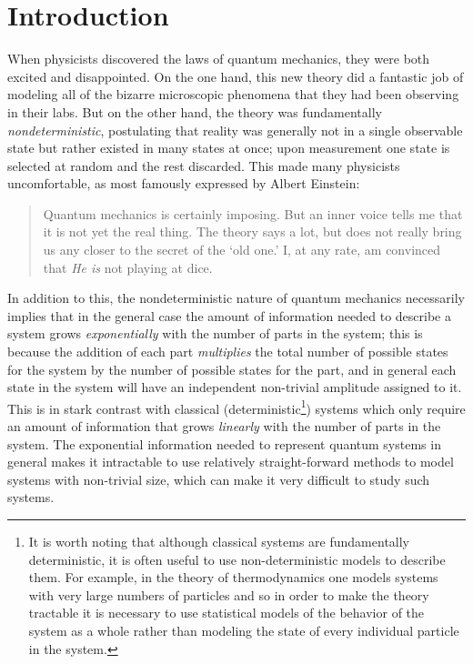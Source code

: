 \documentclass[12pt]{amsbook}
\theoremstyle{plain}
\theoremstyle{definition}
\theoremstyle{remark}
\begin{document}
\part{Introduction}

When physicists discovered the laws of quantum mechanics, they were both excited and disappointed.  On the one hand, this new theory did a fantastic job of modeling all of the bizarre microscopic phenomena that they had been observing in their labs.  But on the other hand, the theory was fundamentally \emph{nondeterministic}, postulating that reality was generally not in a single observable state but rather existed in many states at once; upon measurement one state is selected at random and the rest discarded.  This made many physicists uncomfortable, as most famously expressed by Albert Einstein:

\begin{quote}
Quantum mechanics is certainly imposing. But an inner voice tells me that it is not yet the real thing. The theory says a lot, but does not really bring us any closer to the secret of the `old one.' I, at any rate, am convinced that \emph{He is} not playing at dice{\cite{Born2004}}.
\end{quote}

In addition to this, the nondeterministic nature of quantum mechanics necessarily implies that in the general case the amount of information needed to describe a system grows \emph{exponentially} with the number of parts in the system;  this is because the addition of each part \emph{multiplies} the total number of possible states for the system by the number of possible states for the part, and in general each state in the system will have an independent non-trivial amplitude assigned to it.  This is in stark contrast with classical (deterministic\footnote{It is worth noting that although classical systems are fundamentally deterministic, it is often useful to use non-deterministic models to describe them.  For example, in the theory of thermodynamics one models systems with very large numbers of particles and so in order to make the theory tractable it is necessary to use statistical models of the behavior of the system as a whole rather than modeling the state of every individual particle in the system.}) systems which only require an amount of information that grows \emph{linearly} with the number of parts in the system.  The exponential information needed to represent quantum systems in general makes it intractable to use relatively straight-forward methods to model systems with non-trivial size, which can make it very difficult to study such systems.
\end{document}
